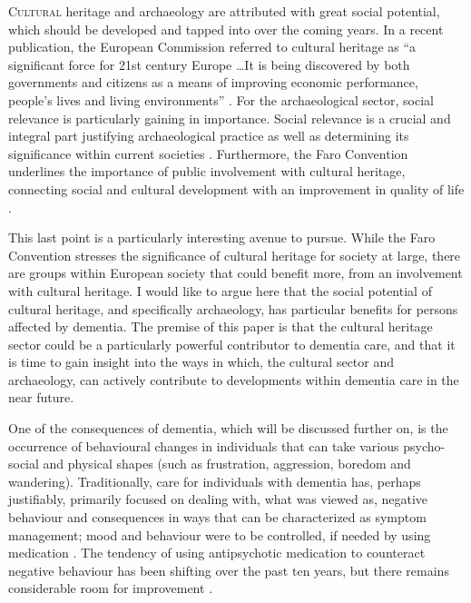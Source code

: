 
\lettrine[nindent=0em,lines=3]{C}{ultural} heritage and archaeology are attributed with great social potential, which should be developed and tapped into over the coming years. In a recent publication, the European Commission referred to cultural heritage as “a significant force for 21st century Europe \ldots It is being discovered by both governments and citizens as a means of improving economic performance, people’s lives and living environments” \parencite[5]{Commission_2015}. For the archaeological sector, social relevance is particularly gaining in importance. Social relevance is a crucial and integral part  justifying archaeological practice as well as determining its significance within current societies \parencite{Boom_inpress}.  
	Furthermore, the Faro Convention \parencite{Europe_2005}  underlines the importance of public involvement with cultural heritage, connecting social and cultural development with  an improvement in quality of life \parencite[5--7]{Europe_2005}.	
		
	This last point is a particularly interesting avenue to pursue. While the Faro Convention stresses the significance of cultural heritage for society at large, there are groups within European society that could benefit more, from an involvement with cultural heritage. I would like to argue here that the social potential of cultural heritage, and specifically archaeology, has particular benefits for persons affected by dementia. The premise of this paper is that the cultural heritage sector could be a particularly powerful contributor to dementia care, and that it is time to gain insight into the ways in which, the cultural sector and archaeology, can actively contribute to developments within dementia care in the near future. 
	
	One of the consequences of dementia, which will be discussed further on, is the occurrence of behavioural changes in individuals that can take various psycho-social and physical shapes (such as frustration, aggression, boredom and wandering). Traditionally, care for individuals with dementia has, perhaps justifiably, primarily focused on dealing with, what was viewed as, negative behaviour and consequences in ways that can be characterized as symptom management; mood and behaviour were to be controlled, if needed by using medication \parencites[541]{Kitwood_1993}[541]{Kitwood_1993}. The tendency of using antipsychotic medication to counteract negative behaviour has been shifting over the past ten years, but there remains considerable room for improvement \parencite[39--44]{Banerjee_2009}.	
	
